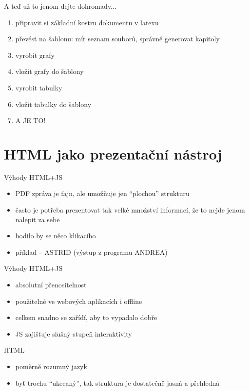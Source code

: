 \documentclass{beamer}
\begin{document}
\begin{frame}{A teď už to jenom dejte dohromady...}
  \begin{enumerate}
    \item připravit si základní kostru dokumentu v latexu
    \item převést na šablonu: mít seznam souborů, správně generovat kapitoly
    \item vyrobit grafy
    \item vložit grafy do šablony
    \item vyrobit tabulky
    \item vložit tabulky do šablony
    \item A JE TO!
  \end{enumerate}
\end{frame}

\section{HTML jako prezentační nástroj}

\begin{frame}{Výhody HTML+JS}
  \begin{itemize}
    \item PDF zpráva je fajn, ale umožňuje jen ``plochou'' strukturu
    \item často je potřeba prezentovat tak velké množství informací, že to nejde jenom nalepit za sebe
    \item hodilo by se něco klikacího
    \item příklad -- ASTRID (výstup z programu ANDREA)
  \end{itemize}
\end{frame}

\begin{frame}{Výhody HTML+JS}
  \begin{itemize}
    \item absolutní přenositelnost
    \item použitelné ve webových aplikacích i offline
    \item celkem snadno se zařídí, aby to vypadalo dobře
    \item JS zajišťuje slušný stupeň interaktivity
  \end{itemize}
\end{frame}

\begin{frame}{HTML}
  \begin{itemize}
    \item poměrně rozumný jazyk
    \item byť trochu ``ukecaný'', tak struktura je dostatečně jasná a přehledná
  \end{itemize}
\end{frame}
\end{document}
